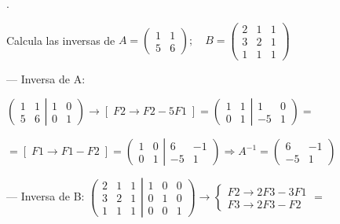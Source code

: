 \begin{ejre}.

Calcula las inversas de $A=\left( \begin{matrix}  1&1\\5&6  \end{matrix} \right); \quad B=\left( \begin{matrix} 2&1&1\\3&2&1\\1&1&1   \end{matrix} \right)$
\end{ejre}
\begin{proofw}\renewcommand{\qedsymbol}{$\diamond$}

--- Inversa de A:

$\left( \begin{matrix} 1&1\\5&6   \end{matrix} \right|
\left. \begin{matrix} 1&0\\0&1   \end{matrix} \right) \to [\;F2 \to F2-5F1  \;]=
\left( \begin{matrix} 1&1\\0&1   \end{matrix} \right|
\left. \begin{matrix} 1&0\\-5&1   \end{matrix} \right) = $

$=[\; F1 \to F1-F2   \;]= 
\left( \begin{matrix} 1&0\\0&1   \end{matrix} \right|
\left. \begin{matrix} 6&-1\\-5&1   \end{matrix} \right) \Rightarrow A^{-1}=
\left( \begin{matrix} 6&-1\\-5&1   \end{matrix} \right)$

--- Inversa de B:
$\left( \begin{matrix} 2&1&1\\3&2&1\\1&1&1   \end{matrix} \right|
\left. \begin{matrix} 1&0&0\\0&1&0\\0&0&1   \end{matrix} \right) \to \begin{cases} F2\to 2F3-3F1 \\F3\to 2F3-F2 \end{cases}=$


\end{proofw}
